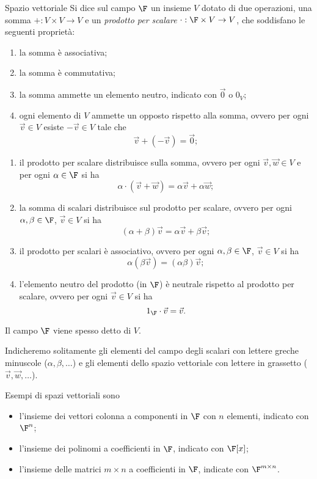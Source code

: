 \begin{definition}
    {Spazio vettoriale}{}
    Si dice  sul campo $\F$ un insieme $V$ dotato di due operazioni, una somma $+ : V \times V \to V$ e un \emph{prodotto per scalare} $\cdot : \F \times V \to V$, che soddisfano le seguenti proprietà: \begin{enumerate}[(S1)]
        \item la somma è associativa;
        \item la somma è commutativa;
        \item la somma ammette un elemento neutro, indicato con $\vec{0}$ o $0_V$;
        \item ogni elemento di $V$ ammette un opposto rispetto alla somma, ovvero per ogni $\vec{v} \in V$ esiste $-\vec v \in V$ tale che \[
            \vec v + (-\vec v) = \vec 0;
        \]
    \end{enumerate} \begin{enumerate}[(P1)]
        \item il prodotto per scalare distribuisce sulla somma, ovvero per ogni $\vec v, \vec w \in V$ e per ogni $\alpha \in \F$ si ha \[
            \alpha \cdot (\vec v + \vec w) = \alpha \vec v + \alpha \vec w;
        \] 
        \item la somma di scalari distribuisce sul prodotto per scalare, ovvero per ogni $\alpha, \beta \in \F$, $\vec v \in V$ si ha \[
            (\alpha + \beta) \vec v = \alpha \vec v + \beta \vec v;
        \] 
        \item il prodotto per scalari è associativo, ovvero per ogni $\alpha, \beta \in \F$, $\vec v \in V$ si ha \[
            \alpha(\beta\vec v) = (\alpha\beta)\vec v;
        \] 
        \item l'elemento neutro del prodotto (in $\F$) è neutrale rispetto al prodotto per scalare, ovvero per ogni $\vec v \in V$ si ha \[
            1_{\F} \cdot \vec v = \vec v.
        \]
    \end{enumerate} 
    Il campo $\F$ viene spesso detto  di $V$.
\end{definition}

Indicheremo solitamente gli elementi del campo degli scalari con lettere greche minuscole ($\alpha, \beta, \dots$) e gli elementi dello spazio vettoriale con lettere in grassetto ($\vec v, \vec w, \dots$).

Esempi di spazi vettoriali sono \begin{itemize}
    \item l'insieme dei vettori colonna a componenti in $\F$ con $n$ elementi, indicato con $\F^n$; 
    \item l'insieme dei polinomi a coefficienti in $\F$, indicato con $\F[x]$;
    \item l'insieme delle matrici $m \times n$ a coefficienti in $\F$, indicate con $\Mat{\F, m, n}$.   
\end{itemize}

